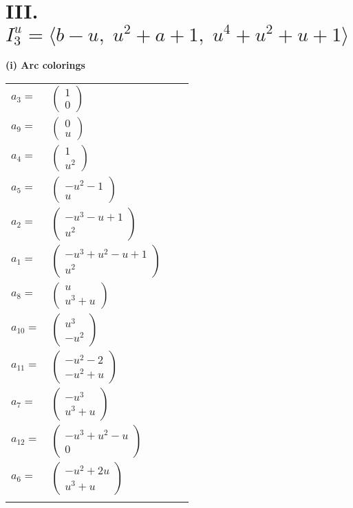 \documentclass[1p]{elsarticle_modified}
\theoremstyle{definition}
\begin{document}
\centering \section*{III. $I^u_{3}= \langle b- u,\;u^2+a+1,\;u^4+u^2+u+1 \rangle$}
\flushleft \textbf{(i) Arc colorings}\\
\begin{tabular}{m{7pt} m{180pt} m{7pt} m{180pt} }
\flushright $a_{3}=$&$\begin{pmatrix}1\\0\end{pmatrix}$ \\
\flushright $a_{9}=$&$\begin{pmatrix}0\\u\end{pmatrix}$ \\
\flushright $a_{4}=$&$\begin{pmatrix}1\\u^2\end{pmatrix}$ \\
\flushright $a_{5}=$&$\begin{pmatrix}- u^2-1\\u\end{pmatrix}$ \\
\flushright $a_{2}=$&$\begin{pmatrix}- u^3- u+1\\u^2\end{pmatrix}$ \\
\flushright $a_{1}=$&$\begin{pmatrix}- u^3+u^2- u+1\\u^2\end{pmatrix}$ \\
\flushright $a_{8}=$&$\begin{pmatrix}u\\u^3+u\end{pmatrix}$ \\
\flushright $a_{10}=$&$\begin{pmatrix}u^3\\- u^2\end{pmatrix}$ \\
\flushright $a_{11}=$&$\begin{pmatrix}- u^2-2\\- u^2+u\end{pmatrix}$ \\
\flushright $a_{7}=$&$\begin{pmatrix}- u^3\\u^3+u\end{pmatrix}$ \\
\flushright $a_{12}=$&$\begin{pmatrix}- u^3+u^2- u\\0\end{pmatrix}$ \\
\flushright $a_{6}=$&$\begin{pmatrix}- u^2+2 u\\u^3+u\end{pmatrix}$\\&\end{tabular}
\end{document}
